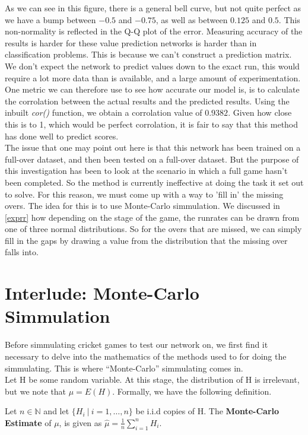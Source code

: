 As we can see in this figure, there is a general bell curve, but not quite perfect as we have a bump between $-0.5$ and $-0.75$, as well as between $0.125$ and $0.5$. This 
non-normality is reflected in the Q-Q plot of the error. Measuring accuracy of the results is harder for these value prediction networks is harder than in classification 
problems. This is because we can't construct a prediction matrix. We don't expect the network to predict values down to the exact run, this would require a lot more 
data than is available, and a large amount of experimentation. One metric we can therefore use to see how accurate our model is, is to calculate 
the corrolation between the actual results and the predicted results. Using the inbuilt \textit{cor()} function, we obtain a corrolation value of 
$0.9382$. Given how close this is to 1, which would be perfect corrolation, it is fair to say that this method has done well to predict scores. \\

The issue that one may point out here is that this network has been trained on a full-over dataset, and then been tested on a full-over dataset. But the purpose of this 
investigation has been to look at the scenario in which a full game hasn't been completed. So the method is currently ineffective at doing the task it set out to solve. For this reason,
we must come up with a way to 'fill in' the missing overs. The idea for this is to use Monte-Carlo simmulation. We discussed in \ref{exprr} how depending on the stage of the game,
the runrates can be drawn from one of three normal distributions. So for the overs that are missed, we can simply fill in the gaps by drawing a value from the distribution that the missing over falls 
into. 

\section{Interlude: Monte-Carlo Simmulation}
\label{mcsim}
Before simmulating cricket games to test our network on, we first find it necessary to delve into the mathematics of the methods used to for doing the simmulating. This is where
``Monte-Carlo'' simmulating comes in. \\
Let H be some random variable. At this stage, the distribution of H is irrelevant, but we note that $\mu = E(H)$. Formally, we have the following definition.

\begin{definition}
    Let $n \in \mathbb{N}$ and let $\{H_i \ | \ i =1,\ldots,n\}$ be i.i.d copies of H. The \textbf{Monte-Carlo Estimate} of $\mu$, is given as $\hat{\mu}=\frac{1}{n}\sum_{i=1}^n H_i$.  
\end{definition}

